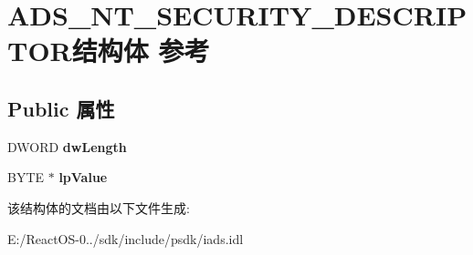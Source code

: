 \hypertarget{struct_a_d_s___n_t___s_e_c_u_r_i_t_y___d_e_s_c_r_i_p_t_o_r}{}\section{A\+D\+S\+\_\+\+N\+T\+\_\+\+S\+E\+C\+U\+R\+I\+T\+Y\+\_\+\+D\+E\+S\+C\+R\+I\+P\+T\+O\+R结构体 参考}
\label{struct_a_d_s___n_t___s_e_c_u_r_i_t_y___d_e_s_c_r_i_p_t_o_r}
\subsection*{Public 属性}
\begin{DoxyCompactItemize}
\item 
\mbox{\label{struct_a_d_s___n_t___s_e_c_u_r_i_t_y___d_e_s_c_r_i_p_t_o_r_af33871c16b627f089d3c1cab644a2f8c}} 
D\+W\+O\+RD {\bfseries dw\+Length}
\item 
\mbox{\label{struct_a_d_s___n_t___s_e_c_u_r_i_t_y___d_e_s_c_r_i_p_t_o_r_a07fa90b75080974e593cd94c59b35ee9}} 
B\+Y\+TE $\ast$ {\bfseries lp\+Value}
\end{DoxyCompactItemize}


该结构体的文档由以下文件生成\+:\begin{DoxyCompactItemize}
\item 
E\+:/\+React\+O\+S-\/0../sdk/include/psdk/iads.\+idl\end{DoxyCompactItemize}
